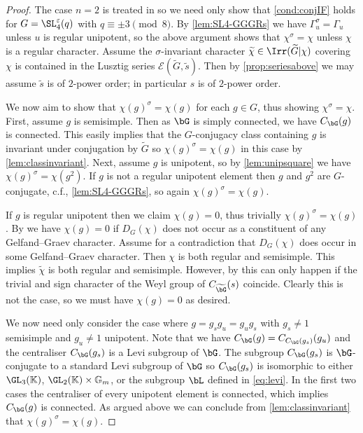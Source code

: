 \documentclass[eqthmnum, nocolour]{jt-calcs}
\renewcommand{\epsilon}{\varepsilon}
\begin{document}
\begin{proof}
The case $n=2$ is treated in \cite{schaeffer-fry:2015:odd-degree-characters} so we need only show that \cref{cond:conjIF} holds for $G = \SL_4^\epsilon(q)$ with $q\equiv\pm 3\pmod8$. By \cref{lem:SL4-GGGRs} we have $\Gamma_u^{\sigma} = \Gamma_u$ unless $u$ is regular unipotent, so the above argument shows that $\chi^{\sigma} = \chi$ unless $\chi$ is a regular character. Assume the $\sigma$-invariant character $\widetilde{\chi} \in \Irr(\widetilde{G} | \chi)$ covering $\chi$ is contained in the Lusztig series $\mathcal{E}(\widetilde{G},\widetilde{s})$. Then by \cref{prop:seriesabove} we may assume $\widetilde{s}$ is of $2$-power order; in particular $s$ is of $2$-power order.

We now aim to show that $\chi(g)^{\sigma} = \chi(g)$ for each $g \in G$, thus showing $\chi^{\sigma} = \chi$. First, assume $g$ is semisimple.  Then as $\bG$ is simply connected, we have $C_{\bG}(g)$ is connected. This easily implies that the $G$-conjugacy class containing $g$ is invariant under conjugation by $\widetilde{G}$ so $\chi(g)^{\sigma} = \chi(g)$ in this case by \cref{lem:classinvariant}. Next, assume $g$ is unipotent, so by \cref{lem:unipsquare} we have $\chi(g)^{\sigma} = \chi(g^2)$. If $g$ is not a regular unipotent element then $g$ and $g^2$ are $G$-conjugate, c.f., \cref{lem:SL4-GGGRs}, so again $\chi(g)^{\sigma} = \chi(g)$.

If $g$ is regular unipotent then we claim $\chi(g) = 0$, thus trivially $\chi(g)^{\sigma} = \chi(g)$. By \cite[Corollary 14.38]{digne-michel:1991:representations-of-finite-groups-of-lie-type} we have $\chi(g) = 0$ if $D_G(\chi)$ does not occur as a constituent of any Gelfand--Graev character. Assume for a contradiction that $D_G(\chi)$ does occur in some Gelfand--Graev character. Then $\chi$ is both regular and semisimple. This implies $\widetilde{\chi}$ is both regular and semisimple. However, by \cite[15.6, 15.10]{bonnafe:2006:sln} this can only happen if the trivial and sign character of the Weyl group of $C_{\widetilde{\bG}}(s)$ coincide. Clearly this is not the case, so we must have $\chi(g) = 0$ as desired.

We now need only consider the case where $g = g_sg_u = g_ug_s$ with $g_s\neq1$ semisimple and $g_u\neq 1$ unipotent. Note that we have $C_{\bG}(g) = C_{C_{\bG}(g_s)}(g_u)$ and the centraliser $C_{\bG}(g_s)$ is a Levi subgroup of $\bG$. The subgroup $C_{\bG}(g_s)$ is $\bG$-conjugate to a standard Levi subgroup of $\bG$ so $C_{\bG}(g_s)$ is isomorphic to either $\GL_3(\mathbb{K})$, $\GL_2(\mathbb{K}) \times \mathbb{G}_m$, or the subgroup $\bL$ defined in \cref{eq:levi}. In the first two cases the centraliser of every unipotent element is connected, which implies $C_{\bG}(g)$ is connected. As argued above we can conclude from \cref{lem:classinvariant} that $\chi(g)^{\sigma} = \chi(g)$.


\end{proof}
\end{document}
